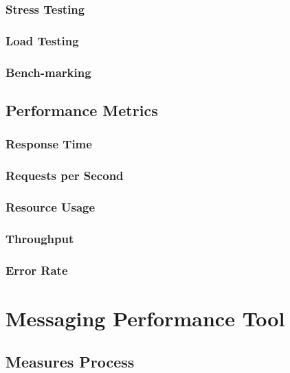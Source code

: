 \subsection*{Stress Testing}

\subsection*{Load Testing}

\subsection*{Bench-marking}

\section{Performance Metrics}
\label{Performance Metrics}

\subsection{Response Time}

\subsection{Requests per Second}

\subsection{Resource Usage}

\subsection{Throughput}

\subsection{Error Rate}

\chapter{Messaging Performance Tool}
\label{Messaging Performance Tool}

\section{Measures Process}
\label{Measures Process}

